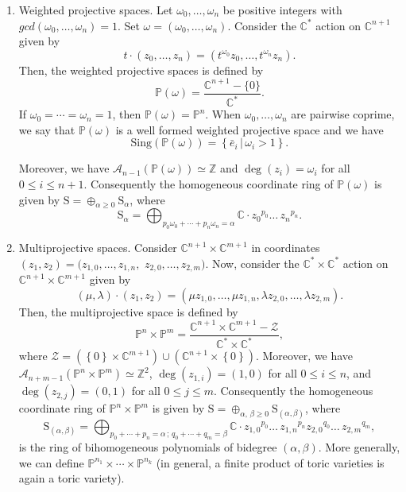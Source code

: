 \documentclass[11pt]{amsart}
\theoremstyle{plain}
\theoremstyle{definition}
\begin{document}
\begin{enumerate}
	\item \label{exe1} Weighted projective spaces. \cite{Cox2} Let $\omega_0,\dots,\omega_n$ be positive integers with 
$gcd(\omega_0,\dots,\omega_n)=1$. Set $\omega=(\omega_{0},\dots,\omega_{n})$. 
Consider the $\mathbb{C}^*$ action on $\mathbb{C}^{n+1}$ given by 
$$t\cdot(z_0,\dots,z_n)=(t^{\omega_0} z_0,\dots, t^{\omega_n} z_n).$$
Then, the weighted projective spaces is defined by
$$\mathbb{P}(\omega) = \frac{\mathbb{C}^{n+1} - \{0\}}{\mathbb{C}^*}.$$ 
If $\omega_0=\cdots=\omega_n=1$, then $\mathbb{P}(\omega)=\mathbb{P}^{n}$. When $\omega_0,\dots,\omega_n$ 
are pairwise coprime, we say that $\mathbb{P}(\omega)$ is a well formed weighted projective space and we have 
$$\mathrm{Sing}(\mathbb{P}(\omega))=\left\{\bar{e}_i\,|\,\omega_i>1\right\}.$$

Moreover, we have $\mathcal{A}_{n-1}(\mathbb{P}(\omega))\simeq\mathbb{Z}$ and $\deg(z_i)=\omega_i$ for all $0\leq i\leq n+1$.
Consequently the homogeneous coordinate ring of $\mathbb{P}(\omega)$ is given by
$\mathrm{S}=\oplus_{\alpha\geq 0}\mathrm{S}_{\alpha}$, where 
$$\mathrm{S}_{\alpha}=\bigoplus_{p_0\omega_0+\cdots+p_n\omega_n=\alpha} \mathbb{C}\cdot {z_0}^{p_0}\dots\,{z_n}^{p_n}.$$

\vskip 0.2cm

 \item \label{exe2} Multiprojective spaces. \cite{Cox2}
Consider $\mathbb{C}^{n+1}\times\mathbb{C}^{m+1}$ in coordinates $(z_1,z_2)=(z_{1,0},\ldots,z_{1,n},$ $z_{2,0},\ldots,z_{2,m})$. 
Now, consider the $\mathbb{C}^*\times\mathbb{C}^*$ action on $\mathbb{C}^{n+1}\times\mathbb{C}^{m+1}$ given by 
$$(\mu,\lambda)\cdot(z_1,z_2)=(\mu z_{1,0},\dots,\mu z_{1,n},\lambda z_{2,0},\dots,\lambda z_{2,m}).$$
Then, the multiprojective space is defined by 
$$\mathbb{P}^n\times\mathbb{P}^m=\frac{\mathbb{C}^{n+1}\times\mathbb{C}^{m+1}-\mathcal{Z}}{\mathbb{C}^*\times\mathbb{C}^*},$$
where $\mathcal{Z}=\left(\left\{0\right\}\times\mathbb{C}^{m+1}\right) \cup \left(\mathbb{C}^{n+1}\times\left\{0\right\}\right)$.
Moreover, we have $\mathcal{A}_{n+m-1}(\mathbb{P}^n\times\mathbb{P}^m)\simeq\mathbb{Z}^2$,
$\deg(z_{1,i})=(1,0)$ for all $0\leq i\leq n$, and $\deg(z_{2,j})=(0,1)$ for all $0\leq j\leq m$.
Consequently the homogeneous coordinate ring of $\mathbb{P}^n\times\mathbb{P}^m$ is given by 
$\mathrm{S}=\oplus_{\alpha,\,\beta\geq 0}\mathrm{S}_{(\alpha,\beta)}$, where 
$$\mathrm{S}_{(\alpha,\beta)}=\bigoplus_{p_0+\cdots+p_n=\alpha\,;\,q_0+\cdots+q_m=\beta} \mathbb{C}\cdot {z_{1,0}}^{p_0}\dots\,{z_{1,n}}^{p_n} 
{z_{2,0}}^{q_0}\dots\,{z_{2,m}}^{q_m},$$
is the ring of bihomogeneous polynomials of bidegree $(\alpha,\beta)$. More generally, we can define 
$\mathbb{P}^{n_1}\times\cdots\times\mathbb{P}^{n_k}$ (in general, a finite product of toric varieties is again a toric variety). \\


\end{enumerate}
\end{document}

